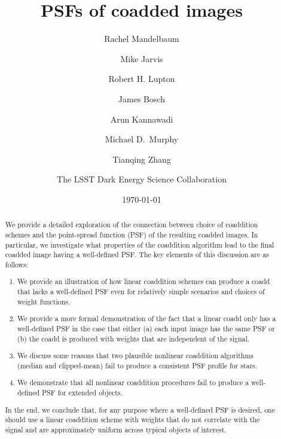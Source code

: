 \documentclass{aastex63}
\newcommand{\irresponse}[1]{{#1}}
\begin{document}
\title{PSFs of coadded images}
\author[0000-0003-2271-1527]{Rachel Mandelbaum}

\author[0000-0002-4179-5175]{Mike Jarvis}

\author[0000-0003-1666-0962]{Robert H. Lupton}

\author[0000-0003-2759-5764]{James Bosch}

\author[0000-0001-8783-6529]{Arun Kannawadi}

\author{Michael D.\ Murphy}

\author[0000-0002-5596-198X]{Tianqing Zhang}


\author{The LSST Dark Energy Science Collaboration}
\noaffiliation

\date{\today}

\begin{abstract}
    \noindent We provide a detailed exploration of the connection between choice of coaddition schemes and the \irresponse{point-spread function (PSF)} of the resulting coadded images.  In particular, we investigate what properties of the coaddition algorithm lead to the final coadded image having a well-defined PSF.  The key elements of this discussion are as follows: 
    \begin{enumerate}[leftmargin=1.8cm]
        \item We provide an illustration of how linear coaddition schemes can produce a coadd that lacks a well-defined PSF even for relatively simple scenarios and choices of weight functions.  
        \item We provide a more formal demonstration of the fact that a linear coadd only has a well-defined PSF in the case that either (a) each input image has the same PSF or (b) the coadd is produced with weights that are independent of the signal.
        \item We discuss some reasons that two plausible nonlinear coaddition algorithms (median and clipped-mean) fail to produce a consistent PSF profile for stars.
        \item We demonstrate that all nonlinear coaddition procedures fail to produce a well-defined PSF for extended objects.
    \end{enumerate}
    \irresponse{In the end, we conclude that, for any purpose where a well-defined PSF is desired, one should use a linear coaddition scheme with weights that do not correlate with the signal and are approximately uniform across typical objects of interest.}
\end{abstract}
\end{document}
